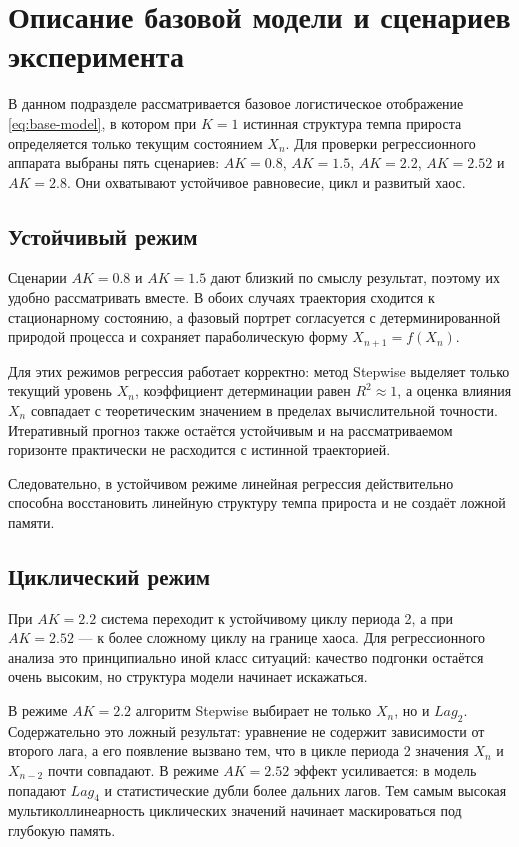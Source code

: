 \section{Описание базовой модели и сценариев эксперимента}
\label{sec:opisanie-bazovoi-modeli-i-stsenariev-eksperimenta}

В данном подразделе рассматривается базовое логистическое отображение \eqref{eq:base-model}, в котором при \(K=1\) истинная структура темпа прироста определяется только текущим состоянием \(X_n\). Для проверки регрессионного аппарата выбраны пять сценариев: \(AK=0.8\), \(AK=1.5\), \(AK=2.2\), \(AK=2.52\) и \(AK=2.8\). Они охватывают устойчивое равновесие, цикл и развитый хаос.

\subsection{Устойчивый режим}
\label{sec:ustoichivyi-rezhim}

Сценарии \(AK=0.8\) и \(AK=1.5\) дают близкий по смыслу результат, поэтому их удобно рассматривать вместе. В обоих случаях траектория сходится к стационарному состоянию, а фазовый портрет согласуется с детерминированной природой процесса и сохраняет параболическую форму \(X_{n+1}=f(X_n)\).

Для этих режимов регрессия работает корректно: метод Stepwise выделяет только текущий уровень \(X_n\), коэффициент детерминации равен \(R^2 \approx 1\), а оценка влияния \(X_n\) совпадает с теоретическим значением в пределах вычислительной точности. Итеративный прогноз также остаётся устойчивым и на рассматриваемом горизонте практически не расходится с истинной траекторией.

Следовательно, в устойчивом режиме линейная регрессия действительно способна восстановить линейную структуру темпа прироста и не создаёт ложной памяти.

\subsection{Циклический режим}
\label{sec:tsiklicheskii-rezhim}

При \(AK=2.2\) система переходит к устойчивому циклу периода 2, а при \(AK=2.52\) --- к более сложному циклу на границе хаоса. Для регрессионного анализа это принципиально иной класс ситуаций: качество подгонки остаётся очень высоким, но структура модели начинает искажаться.

В режиме \(AK=2.2\) алгоритм Stepwise выбирает не только \(X_n\), но и \(Lag_2\). Содержательно это ложный результат: уравнение не содержит зависимости от второго лага, а его появление вызвано тем, что в цикле периода 2 значения \(X_n\) и \(X_{n-2}\) почти совпадают. В режиме \(AK=2.52\) эффект усиливается: в модель попадают \(Lag_4\) и статистические дубли более дальних лагов. Тем самым высокая мультиколлинеарность циклических значений начинает маскироваться под глубокую память.

